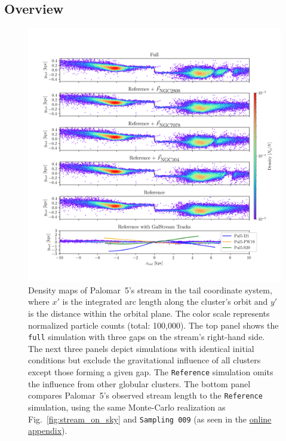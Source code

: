     \subsection{Overview}
        \begin{figure}
            \centering
            \includegraphics[width=\linewidth]{images/decomposition-monte-carlo-009-with-3-gaps-domidpoint-shift.png}
            \caption[Decomposition of the gaps by the various perturbers]{Density maps of Palomar~5's stream in the tail coordinate system, where $x\prime$ is the integrated arc length along the cluster's orbit and $y\prime$ is the distance within the orbital plane. The color scale represents normalized particle counts (total: 100,000). The top panel shows the \texttt{full} simulation with three gaps on the stream's right-hand side. The next three panels depict simulations with identical initial conditions but exclude the gravitational influence of all clusters except those forming a given gap. The \texttt{Reference} simulation omits the influence from other globular clusters. The bottom panel compares Palomar~5's observed stream length to the \texttt{Reference} simulation, using the same Monte-Carlo realization as Fig.~\ref{fig:stream_on_sky} and \texttt{Sampling~009} (as seen in the \href{https://doi.org/10.5281/zenodo.15528089}{online appendix}).}
            \label{fig:decomposition}
        \end{figure} 
    
